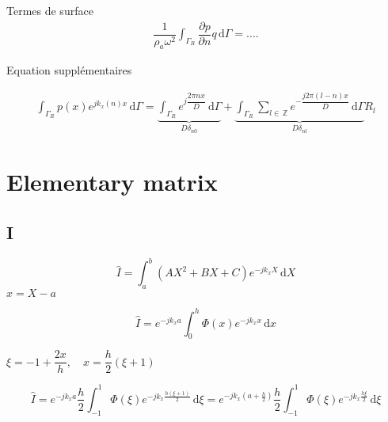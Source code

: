\documentclass[11pt,A4paper]{book}
\newcommand{\ds}{\displaystyle}
\newcommand{\tb}{\textbf}
\newcommand{\mb}{\, \mathbb}
\newcommand{\esp}{, \quad}
\newcommand{\p}{\partial}
\renewcommand{\d}{\,\textrm{d}}
\renewcommand{\:}{\tb{:}}
\begin{document}
Termes de surface
\begin{align}
\dfrac{1}{\rho_a\omega^2}\ds{\int_{\Gamma_R}} \dfrac{\p p}{\p n} q\d\Gamma=....
\end{align}

Equation supplémentaires

\begin{align}
\ds{\int_{\Gamma_R}}p(x) e^{jk_x(n)x}\d\Gamma=
\underbrace{\ds{\int_{\Gamma_R}}e^{j\dfrac{2\pi nx}{D}}\d\Gamma}_{D\delta_{n0}}+
\underbrace{\ds{\int_{\Gamma_R}}
\ds{\sum_{l\in\mb{Z}}}
e^{-\dfrac{j2\pi (l-n)x}{D} }
\d\Gamma}_{D\delta_{nl}}R_l
\end{align}

\section{Elementary matrix}

\subsection{\tb{I}}

\begin{equation}
\hat{I}=\ds{\int_a^b} (AX^2+BX+C)e^{-jk_x X}\d X
\end{equation}
$x=X-a$

\begin{equation}
\hat{I}=e^{-jk_x a} \ds{\int_0^h} {\Phi}(x)e^{-jk_x x}\d x
\end{equation}

$\xi=-1+\dfrac{2x}{h}\esp    x=\dfrac{h}{2}\left(
\xi+1
\right)$


\begin{equation}
\hat{I}=e^{-jk_x a} \dfrac{h}{2} \ds{\int_{-1}^1} {\Phi}(\xi)e^{-jk_x \frac{h(\xi+1)}{2}}\d \xi=
e^{-jk_x \left(a+\frac{h}{2}\right)} \dfrac{h}{2} \ds{\int_{-1}^1} {\Phi}(\xi)e^{-jk_x \frac{h\xi}{2}}\d \xi
\end{equation}





\end{document}
